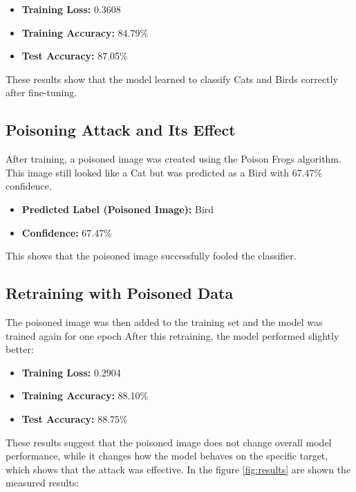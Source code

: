 \begin{itemize}
    \item \textbf{Training Loss:} 0.3608
    \item \textbf{Training Accuracy:} 84.79\%
    \item \textbf{Test Accuracy:} 87.05\%
\end{itemize}

These results show that the model learned to classify Cats and Birds correctly after fine-tuning.

\subsection{Poisoning Attack and Its Effect}

After training, a poisoned image was created using the Poison Frogs algorithm. This image still looked like a Cat but was predicted as a Bird with 67.47\% confidence.

\begin{itemize}
    \item \textbf{Predicted Label (Poisoned Image):} Bird
    \item \textbf{Confidence:} 67.47\%
\end{itemize}

This shows that the poisoned image successfully fooled the classifier.

\subsection{Retraining with Poisoned Data}

The poisoned image was then added to the training set and the model was trained again for one epoch After this retraining, the model performed slightly better:

\begin{itemize}
    \item \textbf{Training Loss:} 0.2904
    \item \textbf{Training Accuracy:} 88.10\%
    \item \textbf{Test Accuracy:} 88.75\%
\end{itemize}

These results suggest that the poisoned image does not change overall model performance, while it changes how the model behaves on the specific target, which shows that the attack was effective.
In the figure \ref{fig:results} are shown the measured results:

